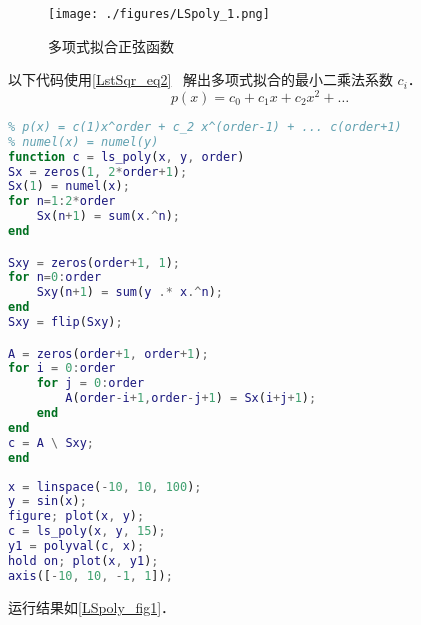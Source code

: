 

\begin{figure}[ht]
\centering
\texttt{[image: ./figures/LSpoly\_1.png]}
\caption{多项式拟合正弦函数} \label{LSpoly_fig1}
\end{figure}

以下代码使用\autoref{LstSqr_eq2}~ 解出多项式拟合的最小二乘法系数 $c_i$．
\begin{equation}
p(x) = c_0 + c_1 x + c_2 x^2 + \dots
\end{equation}

\begin{lstlisting}[language=matlab, caption=ls_poly.m]
% 多项式最小二乘法拟合
% p(x) = c(1)x^order + c_2 x^(order-1) + ... c(order+1)
% numel(x) = numel(y)
function c = ls_poly(x, y, order)
Sx = zeros(1, 2*order+1);
Sx(1) = numel(x);
for n=1:2*order
    Sx(n+1) = sum(x.^n);
end

Sxy = zeros(order+1, 1);
for n=0:order
    Sxy(n+1) = sum(y .* x.^n);
end
Sxy = flip(Sxy);

A = zeros(order+1, order+1);
for i = 0:order
    for j = 0:order
        A(order-i+1,order-j+1) = Sx(i+j+1);
    end
end
c = A \ Sxy;
end
\end{lstlisting}

\begin{lstlisting}[language=matlab]
% ls_poly_demo
x = linspace(-10, 10, 100);
y = sin(x);
figure; plot(x, y);
c = ls_poly(x, y, 15);
y1 = polyval(c, x);
hold on; plot(x, y1);
axis([-10, 10, -1, 1]);
\end{lstlisting}
运行结果如\autoref{LSpoly_fig1}．
